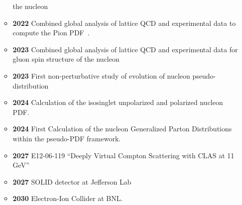 \documentclass[12pt,hyperpdf]{article}
\begin{document}
\begin{itemize}
\begin{itemize}
     the nucleon~\cite{HadStruc:2022yaw}
   \item{\bf 2022} Combined global analysis of lattice QCD and
     experimental data to compute the Pion PDF~\cite{JeffersonLabAngularMomentumJAM:2022aix}.
    \item{\bf 2023} Combined global analysis of lattice QCD and experimental data for gluon spin structure of the nucleon~\cite{Karpie:2023nyg}
    \item{\bf 2023} First non-perturbative study of evolution of nucleon pseudo-distribution~\cite{Dutrieux:2023zpy}
   \item{\bf 2024} Calculation of the isosinglet unpolarized and
     polarized nucleon PDF.
   \item{\bf 2024} First Calculation of the nucleon Generalized Parton
     Distributions within the pseudo-PDF framework.
   \item{\bf 2027} E12-06-119 ``Deeply Virtual Compton Scattering with
     CLAS at 11 GeV''
   \item{\bf 2027} SOLID detector at Jefferson Lab
   \item{\bf 2030} Electron-Ion Collider at BNL.
\end{itemize}
\end{itemize}


\end{document}
